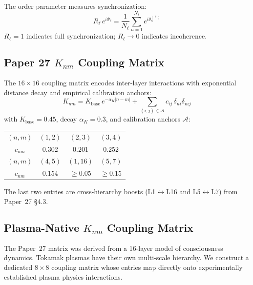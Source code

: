 \documentclass[twocolumn,preprintnumbers,amsmath,amssymb,prl,floatfix]{revtex4-2}
\begin{document}
The order parameter measures synchronization:
%
\begin{equation}
  R_\ell\, e^{i\Psi_\ell}
  = \frac{1}{N_\ell} \sum_{n=1}^{N_\ell} e^{i\theta_n^{(\ell)}}
  \label{eq:order}
\end{equation}
%
$R_\ell = 1$ indicates full synchronization; $R_\ell \to 0$
indicates incoherence.

\subsection{Paper 27 $K_{nm}$ Coupling Matrix}

The $16 \times 16$ coupling matrix encodes inter-layer interactions
with exponential distance decay and empirical calibration anchors:
%
\begin{equation}
  K_{nm} = K_\mathrm{base}\, e^{-\alpha_K |n - m|}
  + \sum_{(i,j) \in \mathcal{A}} c_{ij}\,\delta_{ni}\delta_{mj}
  \label{eq:knm}
\end{equation}
%
with $K_\mathrm{base} = 0.45$, decay $\alpha_K = 0.3$, and
calibration anchors $\mathcal{A}$:
%
\begin{center}
\begin{tabular}{cccc}
\toprule
$(n,m)$ & $(1,2)$ & $(2,3)$ & $(3,4)$ \\
$c_{nm}$ & $0.302$ & $0.201$ & $0.252$ \\
\midrule
$(n,m)$ & $(4,5)$ & $(1,16)$ & $(5,7)$ \\
$c_{nm}$ & $0.154$ & $\geq 0.05$ & $\geq 0.15$ \\
\bottomrule
\end{tabular}
\end{center}
%
The last two entries are cross-hierarchy boosts (L1$\leftrightarrow$L16
and L5$\leftrightarrow$L7) from Paper~27 \S4.3.

\subsection{Plasma-Native $K_{nm}$ Coupling Matrix}
\label{sec:plasma_knm}

The Paper~27 matrix was derived from a 16-layer model of consciousness
dynamics.  Tokamak plasmas have their own multi-scale hierarchy.  We
construct a dedicated $8 \times 8$ coupling matrix whose entries
map directly onto experimentally established plasma physics
interactions.
\end{document}
